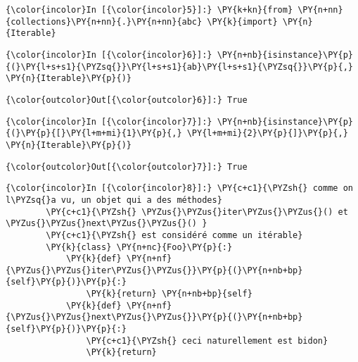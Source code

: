     \begin{Verbatim}[commandchars=\\\{\}]
{\color{incolor}In [{\color{incolor}5}]:} \PY{k+kn}{from} \PY{n+nn}{collections}\PY{n+nn}{.}\PY{n+nn}{abc} \PY{k}{import} \PY{n}{Iterable}
\end{Verbatim}


    \begin{Verbatim}[commandchars=\\\{\}]
{\color{incolor}In [{\color{incolor}6}]:} \PY{n+nb}{isinstance}\PY{p}{(}\PY{l+s+s1}{\PYZsq{}}\PY{l+s+s1}{ab}\PY{l+s+s1}{\PYZsq{}}\PY{p}{,} \PY{n}{Iterable}\PY{p}{)}
\end{Verbatim}


\begin{Verbatim}[commandchars=\\\{\}]
{\color{outcolor}Out[{\color{outcolor}6}]:} True
\end{Verbatim}
            
    \begin{Verbatim}[commandchars=\\\{\}]
{\color{incolor}In [{\color{incolor}7}]:} \PY{n+nb}{isinstance}\PY{p}{(}\PY{p}{[}\PY{l+m+mi}{1}\PY{p}{,} \PY{l+m+mi}{2}\PY{p}{]}\PY{p}{,} \PY{n}{Iterable}\PY{p}{)}
\end{Verbatim}


\begin{Verbatim}[commandchars=\\\{\}]
{\color{outcolor}Out[{\color{outcolor}7}]:} True
\end{Verbatim}
            
    \begin{Verbatim}[commandchars=\\\{\}]
{\color{incolor}In [{\color{incolor}8}]:} \PY{c+c1}{\PYZsh{} comme on l\PYZsq{}a vu, un objet qui a des méthodes}
        \PY{c+c1}{\PYZsh{} \PYZus{}\PYZus{}iter\PYZus{}\PYZus{}() et \PYZus{}\PYZus{}next\PYZus{}\PYZus{}() }
        \PY{c+c1}{\PYZsh{} est considéré comme un itérable}
        \PY{k}{class} \PY{n+nc}{Foo}\PY{p}{:}
            \PY{k}{def} \PY{n+nf}{\PYZus{}\PYZus{}iter\PYZus{}\PYZus{}}\PY{p}{(}\PY{n+nb+bp}{self}\PY{p}{)}\PY{p}{:}
                \PY{k}{return} \PY{n+nb+bp}{self}
            \PY{k}{def} \PY{n+nf}{\PYZus{}\PYZus{}next\PYZus{}\PYZus{}}\PY{p}{(}\PY{n+nb+bp}{self}\PY{p}{)}\PY{p}{:}
                \PY{c+c1}{\PYZsh{} ceci naturellement est bidon}
                \PY{k}{return} 
\end{Verbatim}



